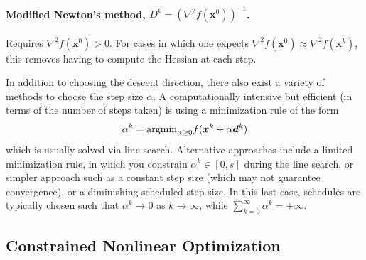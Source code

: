 \paragraph{Modified Newton's method, $D^k = (\nabla^2 f(\bm{x}^0))^{-1}$.} Requires $\nabla^2 f(\bm{x}^0) > 0$. For cases in which one expects $\nabla^2 f(\bm{x}^0) \approx \nabla^2 f(\bm{x}^k)$, this removes having to compute the Hessian at each step. 

In addition to choosing the descent direction, there also exist a variety of methods to choose the step size $\alpha$. A computationally intensive but efficient (in terms of the number of steps taken) is using a minimization rule of the form 
\begin{equation}
\alpha^k = \text{argmin}_{\alpha\geq 0} f(\bm{x}^k + \alpha \bm{d}^k)  
\end{equation}
which is usually solved via line search. Alternative approaches include a limited minimization rule, in which you constrain $\alpha^k \in [0,s]$ during the line search, or simpler approach such as a constant step size (which may not guarantee convergence), or a diminishing scheduled step size. In this last case, schedules are typically chosen such that $\alpha^k \to 0$ as $k \to \infty$, while $\sum_{k=0}^\infty \alpha^k = +\infty$.

\subsection{Constrained Nonlinear Optimization}